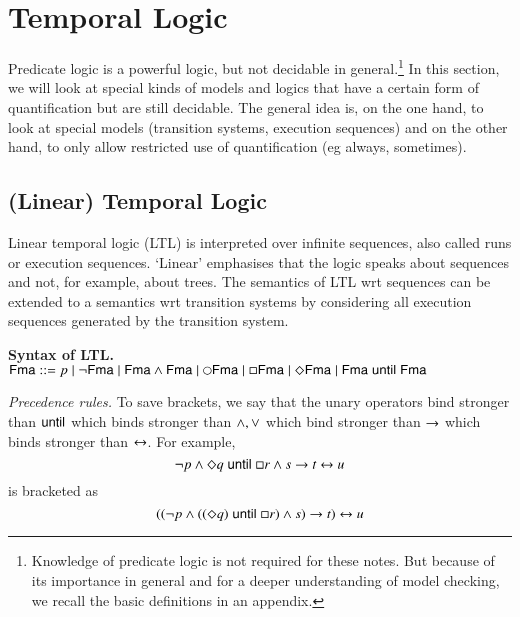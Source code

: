 \section{Temporal Logic}

Predicate logic is a powerful logic, but not decidable in
general.\footnote{Knowledge of predicate logic is not required for
  these notes. But because of its importance in general and for a
  deeper understanding of model checking, we recall the basic
  definitions in an appendix.}  In this section, we will look at
special kinds of models and logics that have a certain form of
quantification but are still decidable. The general idea is, on the
one hand, to look at special models (transition systems, execution
sequences) and on the other hand, to only allow restricted use of
quantification (eg always, sometimes).


\subsection{(Linear) Temporal Logic}\label{sec:LTL:def}

Linear temporal logic (LTL) is interpreted over infinite sequences,
also called runs or execution sequences. `Linear' emphasises that the
logic speaks about sequences and not, for example, about trees. The
semantics of LTL wrt sequences can be extended to a semantics wrt
transition systems by considering all execution sequences generated by
the transition system.


\bigskip\noindent\textbf{Syntax of LTL\@. } $\Fma::=p \mid \neg\Fma \mid
\Fma\et\Fma \mid \next \Fma \mid \Box\Fma \mid \Diamond\Fma \mid
\Fma\until\Fma$
 
\medskip\noindent\textit{Precedence rules. } To save brackets, we say
that the unary operators bind stronger than $\mathrel{\mathsf{until}}$ which binds
stronger than $\wedge,\vee$ which bind stronger than $\rightarrow$ which binds
stronger than $\leftrightarrow$. For example, \[\neg p\wedge \Diamond q\mathrel{\mathsf{until}} \Box
r \wedge s \rightarrow t \leftrightarrow u\]
is bracketed as \[((\neg p\wedge ((\Diamond
q)\mathrel{\mathsf{until}} \Box r) \wedge s) \rightarrow t) \leftrightarrow u\]

